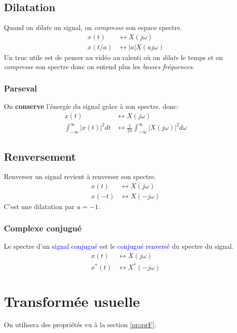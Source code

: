 \documentclass{report}
\begin{document}
\subsection{Dilatation}
Quand on \textit{dilate} un signal, on \textit{compresse} son espace spectre.
\begin{align*}
x(t) &\longleftrightarrow X(j\omega)\\
x(t/a) &\longleftrightarrow |a|X(aj\omega)
\end{align*}
Un truc utile est de penser au vidéo au ralenti où on \textit{dilate} le temps et on \textit{compresse} son spectre donc on entend plus les \textit{basses fréquences}.

\subsubsection{Parseval}
On \textbf{conserve} l'énergie du signal grâce à son spectre. donc:
\begin{align*}
x(t) &\longleftrightarrow X(j\omega)\\
\int_{-\infty}^{\infty} |x(t)|^2 dt &\longleftrightarrow \frac{1}{2\pi} \int_{-\infty}^{\infty} |X(j\omega)|^2 d\omega
\end{align*}

\subsection{Renversement}
Renverser un signal revient à renverser son spectre.
\begin{align*}
x(t) &\longleftrightarrow X(j\omega)\\
x(-t) &\longleftrightarrow X(-j\omega)
\end{align*}
C'est une dilatation par $a = -1$.
\subsubsection{Complexe conjugué}
Le spectre d'un \textcolor{blue}{signal conjugué} est le \textcolor{blue}{conjugué renversé} du spectre du signal.
\begin{align*}
x(t) &\longleftrightarrow X(j\omega)\\
x^*(t) &\longleftrightarrow X^*(-j\omega)
\end{align*}


\section{Transformée usuelle}
On utilisera des propriétés vu à la section \ref{proprF}.
\end{document}
